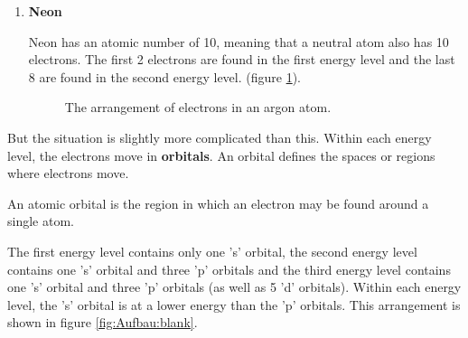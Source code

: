\begin{enumerate}[noitemsep, label=\textbf{\arabic*}. ]
\item{\textbf{Neon} \\
\begin{minipage}{.4\textwidth}
Neon has an atomic number of 10, meaning that a neutral atom also has 10 electrons. The first 2 electrons are found in the first energy level and the last 8 are found in the second energy level. (figure \ref{fig:atom:argon}).
\end{minipage}
\begin{minipage}{.6\textwidth}
\begin{figure}[H]
\begin{center}
\caption{The arrangement of electrons in an argon atom.}
\label{fig:atom:argon}
\end{center}
\end{figure}
\end{minipage}
}
\end{enumerate}


\label{m38741*id259478}But the situation is slightly more complicated than this. Within each energy level, the electrons move in \textbf{orbitals}. An orbital defines the spaces or regions where electrons move.\par 

 { \label{m38741*meaningfhsst!!!underscore!!!id687}
        \label{m38741*id259495}An atomic orbital is the region in which an electron may be found around a single atom.} 

\label{m38741*id6732}
The first energy level contains only one 's' orbital, the second energy level contains one 's' orbital and three 'p' orbitals and the third energy level contains one 's' orbital and three 'p' orbitals (as well as 5 'd' orbitals). Within each energy level, the 's' orbital is at a lower energy than the 'p' orbitals. This arrangement is shown in figure \ref{fig:Aufbau:blank}. 

